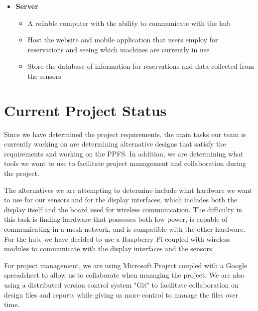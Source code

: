 \documentclass[letterpaper,11pt]{./templates/texMemo} %
\begin{document}
\begin{itemize}
    \item{\textbf{Server}}
    \begin{itemize}
        \item{A reliable computer with the ability to communicate with the hub}
        \item{Host the website and mobile application that users employ for reservations and seeing which machines are currently in use}
        \item{Store the database of information for reservations and data collected from the sensors}
    \end{itemize}
    \end{itemize}

\section{Current Project Status}		

Since we have determined the project requirements, the main tasks our team is currently working on are determining alternative designs that satisfy the requirements and working on the PPFS. In addition, we are determining what tools we want to use to facilitate project management and collaboration during the project.

\noindent{} The alternatives we are attempting to determine include what hardware we want to use for our sensors and for the display interfaces, which includes both the display itself and the board used for wireless communication. The difficulty in this task is finding hardware that possesses both low power, is capable of communicating in a mesh network, and is compatible with the other hardware. For the hub, we have decided to use a Raspberry Pi coupled with wireless modules to communicate with the display interfaces and the sensors.

\noindent{} For project management, we are using Microsoft Project coupled with a Google spreadsheet to allow us to collaborate when managing the project. We are also using a distributed version control system "Git" to facilitate collaboration on design files and reports while giving us more control to manage the files over time.
\end{document}
